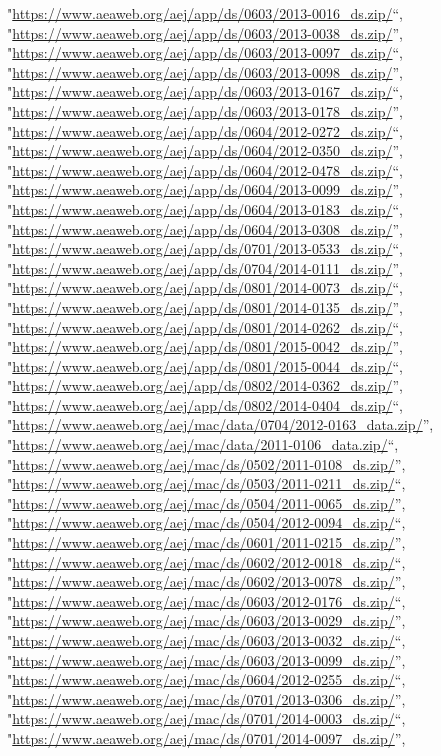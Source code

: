 \documentclass[]{article}
\begin{document}
\begin{itemize}
  "\url{https://www.aeaweb.org/aej/app/ds/0603/2013-0016_ds.zip/}``,
  "\url{https://www.aeaweb.org/aej/app/ds/0603/2013-0038_ds.zip/}'',
  "\url{https://www.aeaweb.org/aej/app/ds/0603/2013-0097_ds.zip/}``,
  "\url{https://www.aeaweb.org/aej/app/ds/0603/2013-0098_ds.zip/}'',
  "\url{https://www.aeaweb.org/aej/app/ds/0603/2013-0167_ds.zip/}``,
  "\url{https://www.aeaweb.org/aej/app/ds/0603/2013-0178_ds.zip/}'',
  "\url{https://www.aeaweb.org/aej/app/ds/0604/2012-0272_ds.zip/}``,
  "\url{https://www.aeaweb.org/aej/app/ds/0604/2012-0350_ds.zip/}'',
  "\url{https://www.aeaweb.org/aej/app/ds/0604/2012-0478_ds.zip/}``,
  "\url{https://www.aeaweb.org/aej/app/ds/0604/2013-0099_ds.zip/}'',
  "\url{https://www.aeaweb.org/aej/app/ds/0604/2013-0183_ds.zip/}``,
  "\url{https://www.aeaweb.org/aej/app/ds/0604/2013-0308_ds.zip/}'',
  "\url{https://www.aeaweb.org/aej/app/ds/0701/2013-0533_ds.zip/}``,
  "\url{https://www.aeaweb.org/aej/app/ds/0704/2014-0111_ds.zip/}'',
  "\url{https://www.aeaweb.org/aej/app/ds/0801/2014-0073_ds.zip/}``,
  "\url{https://www.aeaweb.org/aej/app/ds/0801/2014-0135_ds.zip/}'',
  "\url{https://www.aeaweb.org/aej/app/ds/0801/2014-0262_ds.zip/}``,
  "\url{https://www.aeaweb.org/aej/app/ds/0801/2015-0042_ds.zip/}'',
  "\url{https://www.aeaweb.org/aej/app/ds/0801/2015-0044_ds.zip/}``,
  "\url{https://www.aeaweb.org/aej/app/ds/0802/2014-0362_ds.zip/}'',
  "\url{https://www.aeaweb.org/aej/app/ds/0802/2014-0404_ds.zip/}``,
  "\url{https://www.aeaweb.org/aej/mac/data/0704/2012-0163_data.zip/}'',
  "\url{https://www.aeaweb.org/aej/mac/data/2011-0106_data.zip/}``,
  "\url{https://www.aeaweb.org/aej/mac/ds/0502/2011-0108_ds.zip/}'',
  "\url{https://www.aeaweb.org/aej/mac/ds/0503/2011-0211_ds.zip/}``,
  "\url{https://www.aeaweb.org/aej/mac/ds/0504/2011-0065_ds.zip/}'',
  "\url{https://www.aeaweb.org/aej/mac/ds/0504/2012-0094_ds.zip/}``,
  "\url{https://www.aeaweb.org/aej/mac/ds/0601/2011-0215_ds.zip/}'',
  "\url{https://www.aeaweb.org/aej/mac/ds/0602/2012-0018_ds.zip/}``,
  "\url{https://www.aeaweb.org/aej/mac/ds/0602/2013-0078_ds.zip/}'',
  "\url{https://www.aeaweb.org/aej/mac/ds/0603/2012-0176_ds.zip/}``,
  "\url{https://www.aeaweb.org/aej/mac/ds/0603/2013-0029_ds.zip/}'',
  "\url{https://www.aeaweb.org/aej/mac/ds/0603/2013-0032_ds.zip/}``,
  "\url{https://www.aeaweb.org/aej/mac/ds/0603/2013-0099_ds.zip/}'',
  "\url{https://www.aeaweb.org/aej/mac/ds/0604/2012-0255_ds.zip/}``,
  "\url{https://www.aeaweb.org/aej/mac/ds/0701/2013-0306_ds.zip/}'',
  "\url{https://www.aeaweb.org/aej/mac/ds/0701/2014-0003_ds.zip/}``,
  "\url{https://www.aeaweb.org/aej/mac/ds/0701/2014-0097_ds.zip/}'',

\end{itemize}
\end{document}
